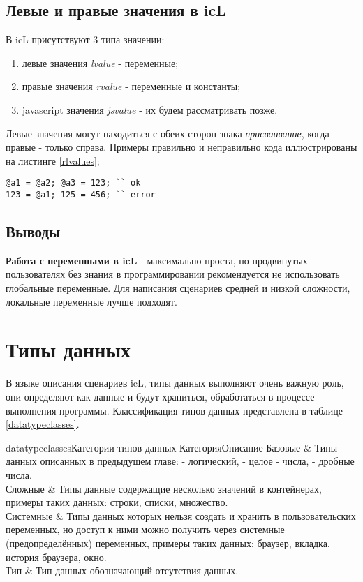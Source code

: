 \documentclass[a4paper, 14pt]{extarticle}
\newenvironment{icEnum}
	{ \begin{enumerate}[noitemsep,nolistsep] }
	{ \end{enumerate} }
\begin{document}
\subsection{Левые и правые значения в icL}

В icL присутствуют 3 типа значении:

\begin{icEnum}
\item
	левые значения {\it lvalue} - переменные;
\item
	правые значения {\it rvalue} - переменные и константы;
\item
	javascript значения {\it jsvalue} - их будем рассматривать позже.
\end{icEnum}

Левые значения могут находиться с обеих сторон знака {\it присваивание}, когда правые - только справа. Примеры правильно и неправильно кода иллюстрированы на листинге \ref{rlvalues};

\begin{lstlisting}[caption=Левые и правые значения, label=rlvalues]
@a1 = @a2; @a3 = 123; `` ok
123 = @a1; 125 = 456; `` error
\end{lstlisting}

\subsection{Выводы}

{\bf Работа с переменными в icL} - максимально проста, но продвинутых пользователях без знания в программировании рекомендуется не использовать глобальные переменные. Для написания сценариев средней и низкой сложности, локальные переменные лучше подходят.

\section{Типы данных}

В языке описания сценариев icL, типы данных выполняют очень важную роль, они определяют как данные и будут храниться, обработаться в процессе выполнения программы. Классификация типов данных представлена в таблице \ref{datatypeclasses}.

\stabletwo{3.5cm}{13.6cm}
{datatypeclasses}{Категории типов данных}
{Категория}{Описание}
{
	Базовые     & Типы данных описанных в предыдущем главе: \bool{}{} - логический, \integer{} - целое - числа, \double{} - дробные числа. \\ \hline
	Сложные     & Типы данные содержащие несколько значений в контейнерах, примеры таких данных: строки, списки, множество. \\ \hline
	Системные   & Типы данных которых нельзя создать и хранить в пользовательских переменных, но доступ к ними можно получить через системные (предопределённых) переменных, примеры таких данных: браузер, вкладка, история браузера, окно. \\ \hline
	Тип \void{} & Тип данных обозначающий отсутствия данных.
}
\end{document}
